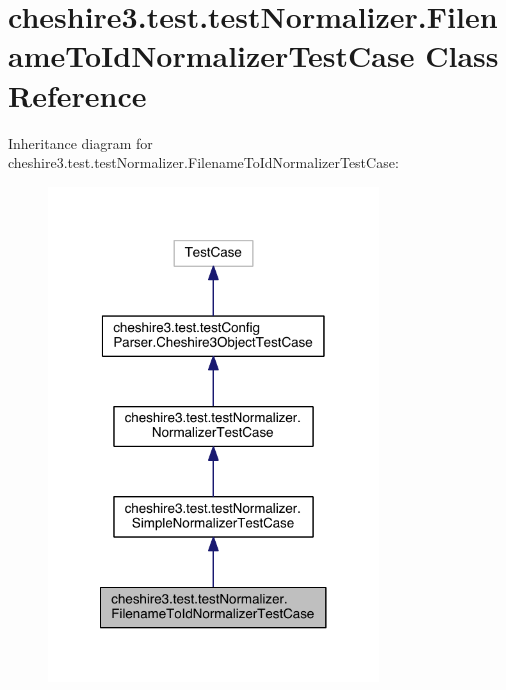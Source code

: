 \hypertarget{classcheshire3_1_1test_1_1test_normalizer_1_1_filename_to_id_normalizer_test_case}{\section{cheshire3.\-test.\-test\-Normalizer.\-Filename\-To\-Id\-Normalizer\-Test\-Case Class Reference}
\label{classcheshire3_1_1test_1_1test_normalizer_1_1_filename_to_id_normalizer_test_case}
}


Inheritance diagram for cheshire3.\-test.\-test\-Normalizer.\-Filename\-To\-Id\-Normalizer\-Test\-Case\-:
\nopagebreak
\begin{figure}[H]
\begin{center}
\leavevmode
\includegraphics[width=248pt]{classcheshire3_1_1test_1_1test_normalizer_1_1_filename_to_id_normalizer_test_case__inherit__graph}
\end{center}
\end{figure}


